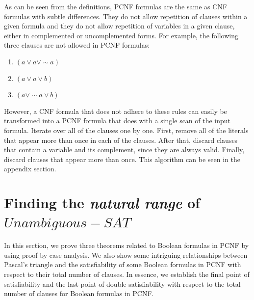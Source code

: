\documentclass[runningheads,a4paper]{llncs}
\let\oldsim\sim
\renewcommand{\sim}{{\oldsim}}
\begin{document}
As can be seen from the definitions, PCNF formulas are the same as CNF formulas with subtle differences. They do not allow repetition of clauses within a given formula and they do not allow repetition of variables in a given clause, either in complemented or uncomplemented forms. For example, the following three clauses are not allowed in PCNF formulas: 
\begin{enumerate}
\item $({a}\vee {a}\vee \sim {a})$ 
\item $({a} \vee {a} \vee {b})$
\item $({a} \vee \sim{a} \vee {b})$
\end{enumerate}

However, a CNF formula that does not adhere to these rules can easily be transformed into a PCNF formula that does with a single scan of the input formula. Iterate over all of the clauses one by one. First, remove all of the literals that appear more than once in each of the clauses. After that, discard clauses that contain a variable and its complement, since they are always valid. Finally, discard clauses that appear more than once. This algorithm can be seen in the appendix section.  

\section{Finding the \emph{natural range} of ${Unambiguous-SAT}$}

In this section, we prove three theorems related to Boolean formulas in PCNF by using proof by case analysis. We also show some intriguing relationships between Pascal's triangle and the satisfiability of some Boolean formulas in PCNF with respect to their total number of clauses. In essence, we establish the final point of satisfiability and the last point of double satisfiability with respect to the total number of clauses for Boolean formulas in PCNF. 
\end{document}
